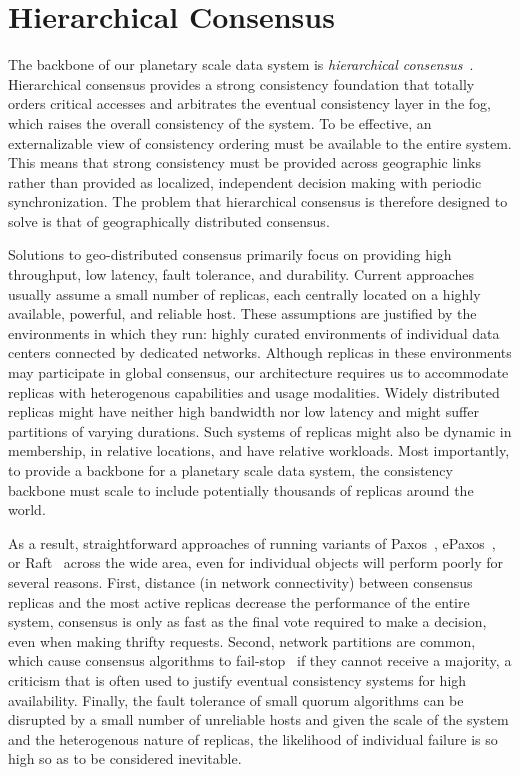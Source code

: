 
\renewcommand{\thechapter}{3}

\chapter{Hierarchical Consensus}
\label{ch:hierarchical_consensus}

The backbone of our planetary scale data system is \emph{hierarchical consensus}~\cite{hc_brief_announcement}.
Hierarchical consensus provides a strong consistency foundation that totally orders critical accesses and arbitrates the eventual consistency layer in the fog, which raises the overall consistency of the system.
To be effective, an externalizable view of consistency ordering must be available to the entire system.
This means that strong consistency must be provided across geographic links rather than provided as localized, independent decision making with periodic synchronization.
The problem that hierarchical consensus is therefore designed to solve is that of geographically distributed consensus.

Solutions to geo-distributed consensus primarily focus on providing high throughput, low latency, fault tolerance, and durability.
Current approaches \cite{epaxos,mencius,calvindb,spaxos,sutra_fast_2011,peluso_making_2016} usually assume a small number of replicas, each centrally located on a highly available, powerful, and reliable host.
These assumptions are justified by the environments in which they run: highly curated environments of individual data centers connected by dedicated networks.
Although replicas in these environments may participate in global consensus, our architecture requires us to accommodate replicas with heterogenous capabilities and usage modalities.
Widely distributed replicas might have neither high bandwidth nor low latency and might suffer partitions of varying durations.
Such systems of replicas might also be dynamic in membership, in relative locations, and have relative workloads.
Most importantly, to provide a backbone for a planetary scale data system, the consistency backbone must scale to include potentially thousands of replicas around the world.

As a result, straightforward approaches of running variants of Paxos~\cite{paxos,paxos_simple}, ePaxos~\cite{epaxos}, or Raft~\cite{raft} across the wide area, even for individual objects will perform poorly for several reasons.
First, distance (in network connectivity) between consensus replicas and the most active replicas decrease the performance of the entire system, consensus is only as fast as the final vote required to make a decision, even when making thrifty requests.
Second, network partitions are common, which cause consensus algorithms to fail-stop~\cite{fail-stop} if they cannot receive a majority, a criticism that is often used to justify eventual consistency systems for high availability.
Finally, the fault tolerance of small quorum algorithms can be disrupted by a small number of unreliable hosts and given the scale of the system and the heterogenous nature of replicas, the likelihood of individual failure is so high so as to be considered inevitable.

